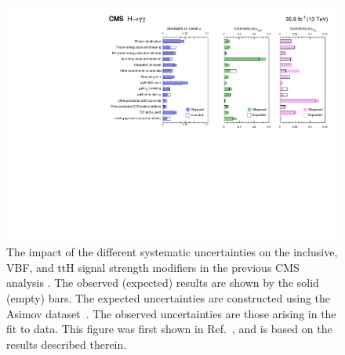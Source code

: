 \begin{figure}[hptb]
  \centering
  \includegraphics[width=\textwidth]{Figures/SigBkg/SystematicsTable.pdf}
  \caption[The impact of systematic uncertainties on signal strength measurements from Ref.~\cite{HIG-16-040}.]
  {
    The impact of the different systematic uncertainties on the inclusive, VBF, and ttH 
    signal strength modifiers in the previous CMS \Hgg analysis \cite{HIG-16-040}.
    The observed (expected) results are shown by the solid (empty) bars.
    The expected uncertainties are constructed using the Asimov dataset~\cite{Cowan}.
    The observed uncertainties are those arising in the fit to data. 
    This figure was first shown in Ref.~\cite{HIG-16-040}, 
    and is based on the results described therein.
  }
  \label{fig:sigbkg_systematics}
\end{figure}
